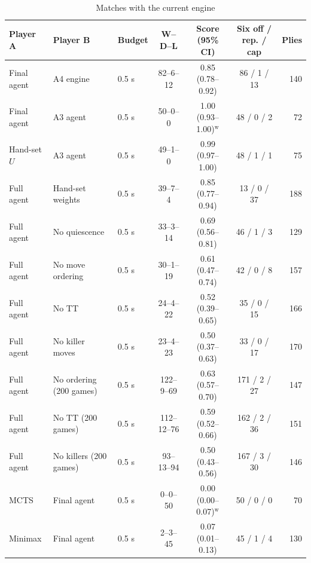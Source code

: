 \begin{table}[!htbp]
\centering\caption{Matches with the current engine}\label{tab:matches-final}
\footnotesize
\begin{tabular}{@{}lllcccr@{}}
\toprule
Player A & Player B & Budget & W--D--L & Score (95\% CI) & Six off / rep. / cap & Plies \\
\midrule
Final agent & A4 engine & 0.5 s & 82--6--12 & 0.85 (0.78--0.92) & 86 / 1 / 13 & 140 \\
Final agent & A3 agent & 0.5 s & 50--0--0 & 1.00 (0.93--1.00)$^{\mathrm{w}}$ & 48 / 0 / 2 & 72 \\
Hand-set $U$ & A3 agent & 0.5 s & 49--1--0 & 0.99 (0.97--1.00) & 48 / 1 / 1 & 75 \\
\midrule
Full agent & Hand-set weights & 0.5 s & 39--7--4 & 0.85 (0.77--0.94) & 13 / 0 / 37 & 188 \\
Full agent & No quiescence & 0.5 s & 33--3--14 & 0.69 (0.56--0.81) & 46 / 1 / 3 & 129 \\
Full agent & No move ordering & 0.5 s & 30--1--19 & 0.61 (0.47--0.74) & 42 / 0 / 8 & 157 \\
Full agent & No TT & 0.5 s & 24--4--22 & 0.52 (0.39--0.65) & 35 / 0 / 15 & 166 \\
Full agent & No killer moves & 0.5 s & 23--4--23 & 0.50 (0.37--0.63) & 33 / 0 / 17 & 170 \\
Full agent & No ordering (200 games) & 0.5 s & 122--9--69 & 0.63 (0.57--0.70) & 171 / 2 / 27 & 147 \\
Full agent & No TT (200 games) & 0.5 s & 112--12--76 & 0.59 (0.52--0.66) & 162 / 2 / 36 & 151 \\
Full agent & No killers (200 games) & 0.5 s & 93--13--94 & 0.50 (0.43--0.56) & 167 / 3 / 30 & 146 \\
\midrule
MCTS & Final agent & 0.5 s & 0--0--50 & 0.00 (0.00--0.07)$^{\mathrm{w}}$ & 50 / 0 / 0 & 70 \\
Minimax & Final agent & 0.5 s & 2--3--45 & 0.07 (0.01--0.13) & 45 / 1 / 4 & 130 \\
\bottomrule
\end{tabular}
\par{}
\end{table}
